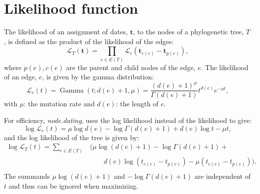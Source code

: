 \documentclass[12pt]{article}
\newcommand{\code}[1]{\emph{#1}}
\begin{document}
	\section{Likelihood function}
		The likelihood of an assignment of dates, $\mathbf{t}$, to the nodes of a phylogenetic tree, $T$, is defined as the product of the likelihood of the edges:
		\[\mathcal{L}_T(\mathbf{t}) = \prod_{e \in E(T)}\mathcal{L}_e(\mathbf{t}_{c(e)} - \mathbf{t}_{p(e)}),\]
		where $p(e), c(e)$ are the parent and child nodes of the edge, $e$.
		The likelihood of an edge, $e$, is given by the gamma distribution:
		\[\mathcal{L}_e(t) = \operatorname{Gamma}(t; d(e) + 1, \mu) = \frac{{(d(e) + 1)}^{\mu}}{\Gamma(d(e) + 1)}t^{d(e)}e^{-\mu t},\]
		with $\mu$: the mutation rate and $d(e)$: the length of $e$.
		
		For efficiency, \code{node.dating}, uses the log likelihood instead of the likelihood to give:
		\[\log\mathcal{L}_e(t) = \mu\log d(e) - \log\Gamma(d(e) + 1) + d(e) \log t - \mu t,\]
		and the log likelihood of the tree is given by:
		\begin{align*}
			\log\mathcal{L}_T(t) = \sum_{e \in E(T)} & \big(\mu\log (d(e) + 1) - \log\Gamma(d(e) + 1) + \\
			&\qquad d(e) \log (t_{c(e)} - t_{p(e)}) - \mu (t_{c(e)} - t_{p(e)})\big). \\
		\end{align*}
		The summands $\mu\log (d(e) + 1)$ and $- \log\Gamma(d(e) + 1)$ are independent of $t$ and thus can be ignored when maximizing.
		
\end{document}
